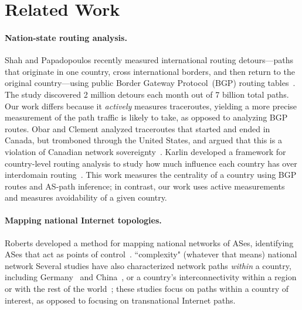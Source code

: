 \section{Related Work}
\label{related}

\paragraph{Nation-state routing analysis.}  Shah and
Papadopoulos recently measured international routing detours---paths that originate
in
one country, cross international borders, and then return to the
original country---using public Border Gateway Protocol~(BGP) routing tables~\cite
{shah2015characterizing}. 
The study discovered 2 million detours each month out
of 7 billion total paths.
Our work differs because it {\em actively}
measures traceroutes, yielding a more precise measurement of the path traffic is
likely to take, as opposed to analyzing BGP
routes.  Obar and Clement analyzed traceroutes
that started and ended in Canada, but tromboned through the United
States, and argued that
this is a violation of Canadian network
sovereignty~\cite{obar2012internet}. 
Karlin \ea{} developed a framework for country-level
routing analysis to study how much influence each country has over
interdomain routing~\cite{karlin2009nation}.  This work measures the
centrality of a country using BGP routes and AS-path inference; in contrast, our work uses active 
measurements and measures avoidability of a given country. 

\paragraph{Mapping national Internet topologies.}  Roberts \ea{} developed a method
for mapping national networks of ASes, identifying ASes that act as points of
control~\cite{roberts2011mapping}.   %
``complexity" (whatever that means) %
national network Several studies have also characterized network paths {\em
within} a country, including
Germany~\cite{wahlisch2010framework,wahlisch2012exposing} and
China~\cite{zhou2007chinese}, or a country's interconnectivity within a region
or with the rest of the
world~\cite{bischof2015and,gupta2014peering,fanou2015diversity}; these studies
focus on paths within a country of interest, as opposed to focusing on
transnational Internet paths.

